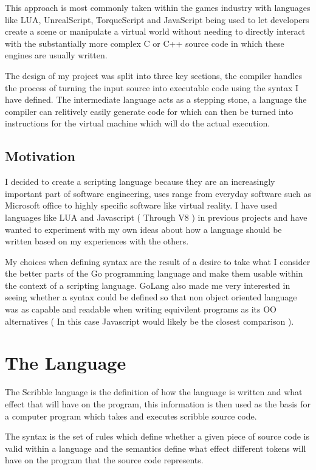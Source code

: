 \documentclass[]{final_report}
\begin{document}
This approach is most commonly taken within the games industry with languages like LUA, UnrealScript, TorqueScript and JavaScript being used to let developers create a scene or manipulate a virtual world without needing to directly interact with the substantially more complex C or C++ source code in which these engines are usually written.

The design of my project was split into three key sections, the compiler handles the process of turning the input source into executable code using the syntax I have defined. The intermediate language acts as a stepping stone, a language the compiler can relitively easily generate code for which can then be turned into instructions for the virtual machine which will do the actual execution.

\section{Motivation}

I decided to create a scripting language because they are an increasingly important part of software engineering, uses range from everyday software such as Microsoft office to highly specific software like virtual reality. I have used languages like LUA and Javascript ( Through V8 ) in previous projects and have wanted to experiment with my own ideas about how a language should be written based on my experiences with the others. 

My choices when defining syntax are the result of a desire to take what I consider the better parts of the Go programming language and make them usable within the context of a scripting language. GoLang also made me very interested in seeing whether a syntax could be defined so that non object oriented language was as capable and readable when writing equivilent programs as its OO alternatives ( In this case Javascript would likely be the closest comparison ).

\chapter{The Language}

The Scribble language is the definition of how the language is written and what effect that will have on the program, this information is then used as the basis for a computer program which takes and executes scribble source code. 

The syntax is the set of rules which define whether a given piece of source code is valid within a language and the semantics define what effect different tokens will have on the program that the source code represents.
\end{document}
